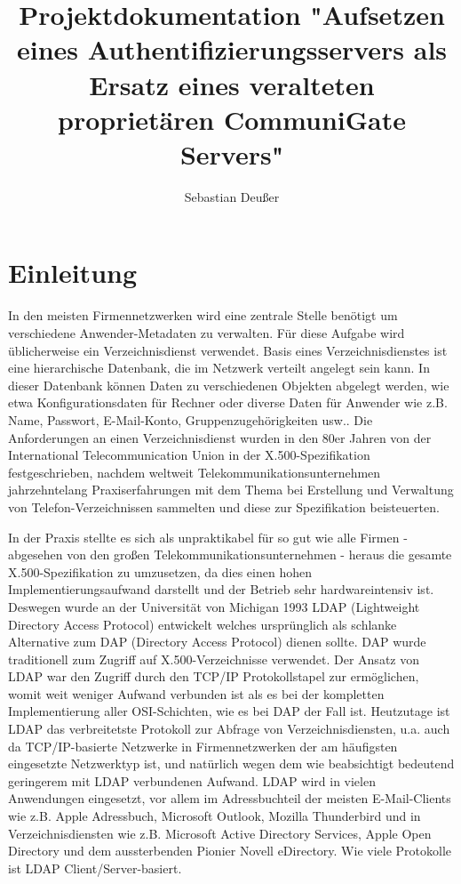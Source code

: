 \documentclass[11pt,a4paper,titlepage=firstiscover,headsepline,bibtotoc]{scrartcl} %
\title{Projektdokumentation "Aufsetzen eines Authentifizierungsservers als Ersatz eines veralteten proprietären CommuniGate Servers"}
\author{Sebastian Deußer}
\begin{document}
\pagestyle{empty}
\maketitle %

\tableofcontents
\newpage
\setcounter{page}{1}  %
\pagestyle{scrheadings}

\section{Einleitung}
In den meisten Firmennetzwerken wird eine zentrale Stelle benötigt um verschiedene Anwender-Metadaten zu verwalten. Für diese Aufgabe wird üblicherweise ein Verzeichnisdienst verwendet. Basis eines Verzeichnisdienstes ist eine hierarchische Datenbank, die im Netzwerk verteilt angelegt sein kann. In dieser Datenbank können Daten zu verschiedenen Objekten abgelegt werden, wie etwa Konfigurationsdaten für Rechner oder diverse Daten für Anwender wie z.B. Name, Passwort, E-Mail-Konto, Gruppenzugehörigkeiten usw.. Die Anforderungen an einen Verzeichnisdienst wurden in den 80er Jahren von der International Telecommunication Union in der X.500-Spezifikation festgeschrieben, nachdem weltweit Telekommunikationsunternehmen jahrzehntelang Praxiserfahrungen mit dem Thema bei Erstellung und Verwaltung von Telefon-Verzeichnissen sammelten und diese zur Spezifikation beisteuerten.

In der Praxis stellte es sich als unpraktikabel für so gut wie alle Firmen - abgesehen von den großen Telekommunikationsunternehmen - heraus die gesamte X.500-Spezifikation zu umzusetzen, da dies einen hohen Implementierungsaufwand darstellt und der Betrieb sehr hardwareintensiv ist. Deswegen wurde an der Universität von Michigan 1993 LDAP (Lightweight Directory Access Protocol) entwickelt welches ursprünglich als schlanke Alternative zum DAP (Directory Access Protocol) dienen sollte. DAP wurde traditionell zum Zugriff auf X.500-Verzeichnisse verwendet. Der Ansatz von LDAP war den Zugriff durch den TCP/IP Protokollstapel zur ermöglichen, womit weit weniger Aufwand verbunden ist als es bei der kompletten Implementierung aller OSI-Schichten, wie es bei DAP der Fall ist. Heutzutage ist LDAP das verbreitetste Protokoll zur Abfrage von Verzeichnisdiensten, u.a. auch da TCP/IP-basierte Netzwerke in Firmennetzwerken der am häufigsten eingesetzte Netzwerktyp ist, und natürlich wegen dem wie beabsichtigt bedeutend geringerem mit LDAP verbundenen Aufwand. LDAP wird in vielen Anwendungen eingesetzt, vor allem im Adressbuchteil der meisten E-Mail-Clients wie z.B. Apple Adressbuch, Microsoft Outlook, Mozilla Thunderbird und in Verzeichnisdiensten wie z.B. Microsoft Active Directory Services, Apple Open Directory und dem aussterbenden Pionier Novell eDirectory. Wie viele Protokolle ist LDAP Client/Server-basiert.
\end{document}

